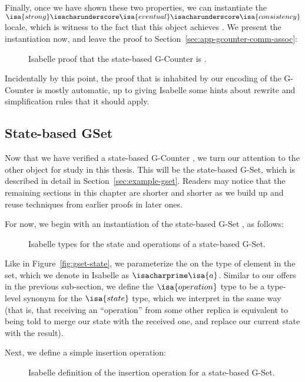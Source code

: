 Finally, once we have shown these two properties, we can instantiate the
$\isa{strong}\isacharunderscore\isa{eventual}\isacharunderscore\isa{consistency}$
locale, which is witness to the fact that this \CRDT object achieves \SEC. We
present the instantiation now, and leave the proof to
Section~\ref{sec:app-gcounter-comm-assoc}:

\begin{figure}[H]
  
  \caption{Isabelle proof that the state-based G-Counter \CRDT is \SEC.}
\end{figure}

Incidentally by this point, the proof that \SEC is inhabited by our encoding of
the G-Counter \SEC is mostly automatic, up to giving Isabelle some hints about
rewrite and simplification rules that it should apply.

\subsection{State-based GSet}

Now that we have verified a state-based G-Counter \CRDT, we turn our attention
to the other \CRDT object for study in this thesis. This will be the state-based
G-Set, which is described in detail in Section~\ref{sec:example-gset}. Readers
may notice that the remaining sections in this chapter are shorter and shorter
as we build up and reuse techniques from earlier proofs in later ones.

For now, we begin with an instantiation of the state-based G-Set \CRDT, as
follows:

\begin{figure}[H]
  
  \caption{Isabelle types for the state and operations of a state-based G-Set.}
\end{figure}

Like in Figure~\ref{fig:gset-state}, we parameterize the \CRDT on the type of
element in the set, which we denote in Isabelle as $\isacharprime\isa{a}$.
Similar to our offers in the previous sub-section, we define the
$\isa{operation}$ type to be a type-level synonym for the $\isa{state}$ type,
which we interpret in the same way (that is, that receiving an ``operation''
from some other replica is equivalent to being told to merge our state with the
received one, and replace our current state with the result).

Next, we define a simple insertion operation:

\begin{figure}[H]
  
  \caption{Isabelle definition of the insertion operation for a state-based
    G-Set.}
\end{figure}

